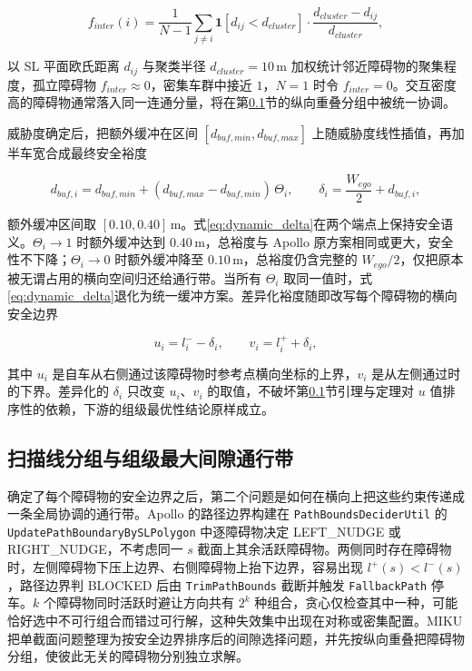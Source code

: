 \documentclass[a4paper,11pt]{ctexart}
\theoremstyle{definition}
\begin{document}
\begin{equation}
    f_{inter}(i) = \frac{1}{N-1} \sum_{j \neq i} \mathbf{1}\!\left[d_{ij} < d_{cluster}\right] \cdot \frac{d_{cluster} - d_{ij}}{d_{cluster}},
    \label{eq:f_inter}
\end{equation}

以 SL 平面欧氏距离 $d_{ij}$ 与聚类半径 $d_{cluster}=10$\,m 加权统计邻近障碍物的聚集程度，孤立障碍物 $f_{inter}\approx 0$，密集车群中接近 $1$，$N=1$ 时令 $f_{inter}=0$。交互密度高的障碍物通常落入同一连通分量，将在第\ref{sec:method_band}节的纵向重叠分组中被统一协调。

威胁度确定后，把额外缓冲在区间 $[d_{buf,min}, d_{buf,max}]$ 上随威胁度线性插值，再加半车宽合成最终安全裕度

\begin{equation}
    d_{buf,i} = d_{buf,min} + (d_{buf,max} - d_{buf,min})\,\Theta_i, \qquad
    \delta_i = \frac{W_{ego}}{2} + d_{buf,i},
    \label{eq:dynamic_delta}
\end{equation}

额外缓冲区间取 $[0.10, 0.40]$\,m。式\eqref{eq:dynamic_delta}在两个端点上保持安全语义。$\Theta_i \to 1$ 时额外缓冲达到 $0.40$\,m，总裕度与 Apollo 原方案相同或更大，安全性不下降；$\Theta_i \to 0$ 时额外缓冲降至 $0.10$\,m，总裕度仍含完整的 $W_{ego}/2$，仅把原本被无谓占用的横向空间归还给通行带。当所有 $\Theta_i$ 取同一值时，式\eqref{eq:dynamic_delta}退化为统一缓冲方案。差异化裕度随即改写每个障碍物的横向安全边界

\begin{equation}
    u_i = l_i^{-} - \delta_i, \qquad v_i = l_i^{+} + \delta_i,
    \label{eq:dynamic_uv}
\end{equation}

其中 $u_i$ 是自车从右侧通过该障碍物时参考点横向坐标的上界，$v_i$ 是从左侧通过时的下界。差异化的 $\delta_i$ 只改变 $u_i$、$v_i$ 的取值，不破坏第\ref{sec:method_band}节引理与定理对 $u$ 值排序性的依赖，下游的组级最优性结论原样成立。

\subsection{扫描线分组与组级最大间隙通行带}
\label{sec:method_band}

确定了每个障碍物的安全边界之后，第二个问题是如何在横向上把这些约束传递成一条全局协调的通行带。Apollo 的路径边界构建在 \texttt{PathBoundsDeciderUtil} 的 \texttt{UpdatePathBoundaryBySLPolygon} 中逐障碍物决定 LEFT\_NUDGE 或 RIGHT\_NUDGE，不考虑同一 $s$ 截面上其余活跃障碍物。两侧同时存在障碍物时，左侧障碍物下压上边界、右侧障碍物上抬下边界，容易出现 $l^{+}(s)<l^{-}(s)$，路径边界判 BLOCKED 后由 \texttt{TrimPathBounds} 截断并触发 \texttt{FallbackPath} 停车。$k$ 个障碍物同时活跃时避让方向共有 $2^k$ 种组合，贪心仅检查其中一种，可能恰好选中不可行组合而错过可行解，这种失效集中出现在对称或密集配置。MIKU 把单截面问题整理为按安全边界排序后的间隙选择问题，并先按纵向重叠把障碍物分组，使彼此无关的障碍物分别独立求解。
\end{document}
